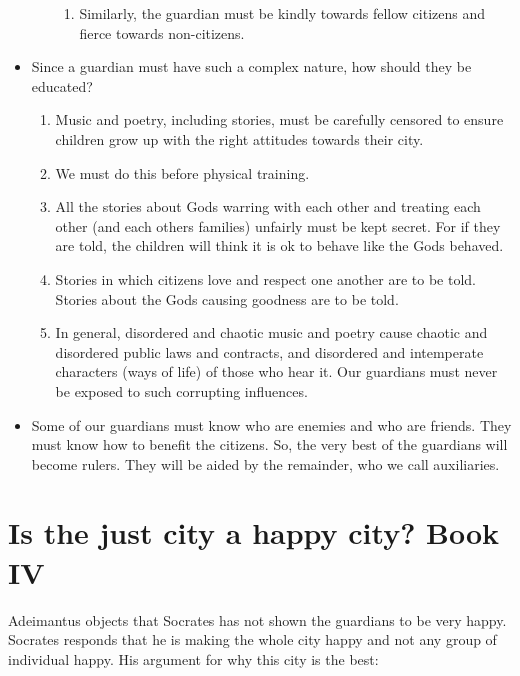 \documentclass[oneside]{article}
\begin{document}
\begin{itemize}
\begin{enumerate}
\begin{enumerate}
\item Similarly, the guardian must be kindly towards fellow citizens and fierce towards non-citizens. 
\end{enumerate}
\end{enumerate}
\item Since a guardian must have such a complex nature, how should they be educated? 
\begin{enumerate}
\item  Music and poetry, including stories, must be carefully censored to ensure children grow up with the right attitudes towards their city. 
\item We must do this before physical training.
\item	All the stories about Gods warring with each other and treating each other (and each others families) unfairly must be kept secret. For if they are told, the children will think it is ok to behave like the Gods behaved.
\item Stories in which citizens love and respect one another are to be told. Stories about the Gods causing goodness are to be told. 
\item In general, disordered and chaotic music and poetry cause chaotic and disordered public laws and contracts, and disordered and intemperate characters (ways of life) of those who hear it. Our guardians must never be exposed to such corrupting influences.
\end{enumerate}
\item Some of our guardians must know who are enemies and who are friends. They must know how to benefit the citizens. So, the very best of the guardians will become rulers. They will be aided by the remainder, who we call auxiliaries.
\end{itemize}



\section*{Is the just city a happy city? Book IV}

Adeimantus objects that Socrates has not  shown the guardians to be very happy. Socrates responds that he is making the whole city happy and not any group of individual happy. His argument for why this city is the best:
\end{document}
